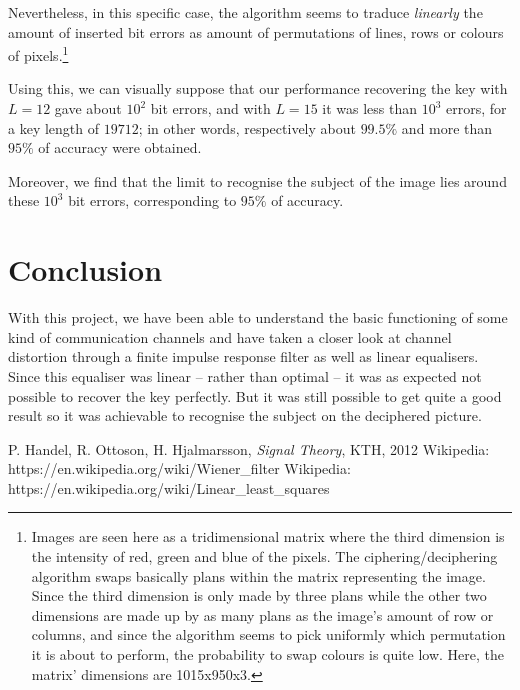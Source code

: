 \documentclass[twocolumn, 12pt]{IEEEtran}
\begin{document}
Nevertheless, in this specific case, the algorithm seems to traduce \textit{linearly} the amount of inserted bit errors as amount of permutations of lines, rows or colours of pixels.\footnote{Images are seen here as a tridimensional matrix where the third dimension is the intensity of red, green and blue of the pixels. The ciphering/deciphering algorithm swaps basically plans within the matrix representing the image. Since the third dimension is only made by three plans while the other two dimensions are made up by as many plans as the image's amount of row or columns, and since the algorithm seems to pick uniformly which permutation it is about to perform, the probability to swap colours is quite low. Here, the matrix' dimensions are 1015x950x3.}

Using this, we can visually suppose that our performance recovering the key with $L=12$ gave about $10^2$ bit errors, and with $L=15$ it was less than $10^3$ errors, for a key length of ${19712}$; in other words, respectively about $99.5\%$ and more than $95\%$ of accuracy were obtained.

Moreover, we find that the limit to recognise the subject of the image lies around these $10^{3}$ bit errors, corresponding to $95\%$ of accuracy. 


\section{Conclusion}

With this project, we have been able to understand the basic functioning of some kind of communication channels and have taken a closer look at channel distortion through a finite impulse response filter as well as linear equalisers. Since this equaliser was linear -- rather than optimal -- it was as expected not possible to recover the key perfectly. But it was still possible to get quite a good result so it was achievable to recognise the subject on the deciphered picture.



\begin{thebibliography}{1}

P. Handel, R. Ottoson, H. Hjalmarsson, \emph{Signal Theory}, KTH, 2012
Wikipedia: https://en.wikipedia.org/wiki/Wiener\_filter
Wikipedia: https://en.wikipedia.org/wiki/Linear\_least\_squares

\end{thebibliography}

\balance
\end{document}

